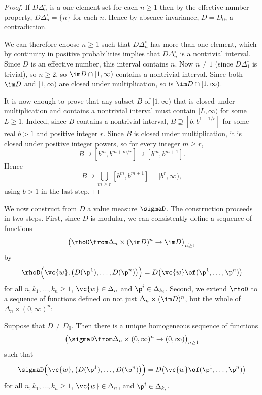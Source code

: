 \begin{proof}
If $D\Delta_n^\circ$ is a one-element set for each $n \geq 1$ then by the
effective number property, $D\Delta_n^\circ = \{n\}$ for each $n$.  Hence
by absence-invariance, $D = D_0$, a contradiction.

We can therefore choose $n \geq 1$ such that $D\Delta_n^\circ$ has more
than one element, which by continuity in positive probabilities implies
that $D\Delta_n^\circ$ is a nontrivial interval.  Since $D$ is an effective
number, this interval contains $n$.  Now $n \neq 1$ (since
$D\Delta_1^\circ$ is trivial), so $n \geq 2$, so $\im D \cap [1, \infty)$
  contains a nontrivial interval.  Since both $\im D$ and $[1, \infty)$ are
    closed under multiplication, so is $\im D \cap [1, \infty)$.

It is now enough to prove that any subset $B$ of $[1, \infty)$ that is
closed under multiplication and contains a nontrivial interval must contain
$[L, \infty)$ for some $L \geq 1$.  Indeed, since $B$ contains a nontrivial
interval, $B \supseteq [b, b^{1 + 1/r}]$ for some real $b > 1$ and
positive integer $r$.  Since $B$ is closed under multiplication, it
is closed under positive integer powers, so for every integer $m \geq r$,
\[
B
\supseteq
[b^m, b^{m + m/r}]
\supseteq
[b^m, b^{m + 1}].
\]
Hence
\[
B 
\supseteq 
\bigcup_{m \geq r} [b^m, b^{m + 1}]
=
[b^r, \infty),
\]
using $b > 1$ in the last step.
\end{proof}

We now construct from $D$ a value measure $\sigmaD$.  The construction
proceeds in two steps.  First, since $D$ is modular, we can consistently
define a sequence of functions
\[
\bigl( 
\rhoD \from \Delta_n \times (\im D)^n \to \im D
\bigr)_{n \geq 1}
\]
by
\[
\rhoD\Bigl( \vc{w}, \bigl(D(\p^1), \ldots, D(\p^n)\bigr) \Bigr)
=
D\bigl( \vc{w} \of (\p^1, \ldots, \p^n) \bigr)
\]
for all $n, k_1, \ldots, k_n \geq 1$, $\vc{w} \in \Delta_n$ and $\p^i \in
\Delta_{k_i}$.  Second, we extend $\rhoD$ to a sequence of functions
defined on not just $\Delta_n \times (\im D)^n$, but the whole of $\Delta_n
\times (0, \infty)^n$:

\begin{lemma}
Suppose that $D \neq D_0$.  Then there is a unique homogeneous sequence of
functions
\[
\bigl( 
\sigmaD \from \Delta_n \times (0, \infty)^n \to (0, \infty) 
\bigr)_{n \geq 1}
\]
such that
\[
\sigmaD\Bigl( \vc{w}, \bigl(D(\p^1), \ldots, D(\p^n)\bigr) \Bigr)
=
D\bigl( \vc{w} \of (\p^1, \ldots, \p^n) \bigr)
\]
for all $n, k_1, \ldots, k_n \geq 1$, $\vc{w} \in \Delta_n$, and $\p^i \in
\Delta_{k_i}$.
\end{lemma}

